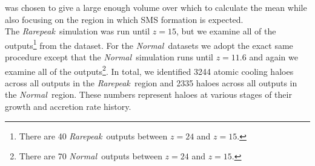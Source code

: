 \documentclass[graphics, twocolumn, usenatbib]{mn2e}
\newcommand{\rarepeak} {\textit{Rarepeak~}}
\newcommand{\normal} {\textit{Normal~}}
\begin{document}
%
was chosen to give a large enough
volume over which to calculate the mean while also focusing on the region in which SMS formation is
expected. \\
\indent The \rarepeak simulation was run until $z=15$, but we
examine all of the outputs\footnote{There are 40 \rarepeak outputs between $z = 24$ and $z = 15$.}
from the dataset. For the \normal datasets we adopt the exact same procedure except that
the \normal simulation runs until $z = 11.6$ and again we examine all of the
outputs\footnote{There are 70 \normal outputs between $z = 24$ and $z = 15$.}.  In total, we identified
3244 atomic cooling haloes across all outputs in the \rarepeak region and 2335
haloes across all outputs in the \normal region. These numbers represent haloes at various stages
of their growth and accretion rate history. 
\end{document}
